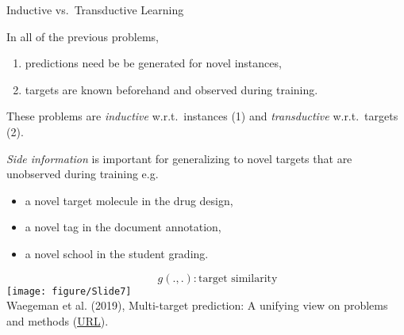 \documentclass[11pt,compress,t,notes=noshow, xcolor=table]{beamer}
\begin{document}
\begin{frame}{Inductive vs.\ Transductive Learning}
	\footnotesize
	\begin{itemize} 
		\item In all of the previous problems, 
		\begin{enumerate} \footnotesize
			\item predictions need be be generated for novel instances, 
            \vspace{10pt}
			\item targets are known beforehand and observed during training.
		\end{enumerate}
		\item These problems are \emph{inductive} w.r.t.\ instances (1) and \emph{transductive} w.r.t.\ targets (2).
        \vspace{20pt}


		\begin{minipage}{0.45\textwidth}    
			\item 	\emph{Side information} is important for generalizing to novel targets that are unobserved during training e.g.
            \begin{itemize}
                \footnotesize
                \item a novel target molecule in the drug design,
                \item a novel tag in the document annotation,
                \item a novel school in the student grading.
            \end{itemize} 
		\end{minipage}
        \hfill
		\begin{minipage}{0.45\textwidth}    
			\begin{center}
			
				\tiny{$$\qquad g(.,.): \mbox{target similarity}$$}
				\texttt{[image: figure/Slide7]}  \tiny
				\\ Waegeman et al. (2019), Multi-target prediction:
				A unifying view on problems and methods (\href{https://arxiv.org/pdf/1809.02352.pdf}{\underline{URL}}).
	
			\end{center}
		\end{minipage}
	\end{itemize}
\end{frame}
\end{document}
